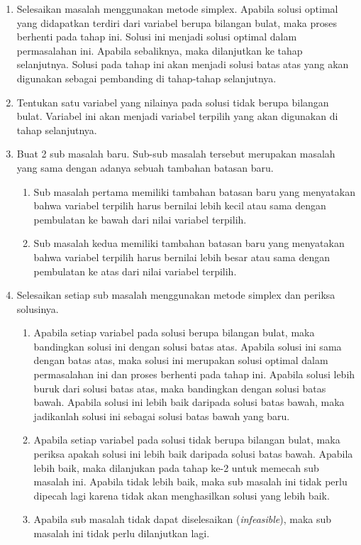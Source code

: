 \begin{enumerate}
	\item Selesaikan masalah menggunakan metode simplex. Apabila solusi optimal yang didapatkan terdiri dari variabel berupa bilangan bulat, maka proses berhenti pada tahap ini. Solusi ini menjadi solusi optimal dalam permasalahan ini. Apabila sebaliknya, maka dilanjutkan ke tahap selanjutnya. Solusi pada tahap ini akan menjadi solusi batas atas yang akan digunakan sebagai pembanding di tahap-tahap selanjutnya.

	\item Tentukan satu variabel yang nilainya pada solusi tidak berupa bilangan bulat. Variabel ini akan menjadi variabel terpilih yang akan digunakan di tahap selanjutnya.

	\item Buat 2 sub masalah baru. Sub-sub masalah tersebut merupakan masalah yang sama dengan adanya sebuah tambahan batasan baru. 
	\begin{enumerate}
		\item Sub masalah pertama memiliki tambahan batasan baru yang menyatakan bahwa variabel terpilih harus bernilai lebih kecil atau sama dengan pembulatan ke bawah dari nilai variabel terpilih.
		
		\item Sub masalah kedua memiliki tambahan batasan baru yang menyatakan bahwa variabel terpilih harus bernilai lebih besar atau sama dengan pembulatan ke atas dari nilai variabel terpilih.
	\end{enumerate}
		
	\item Selesaikan setiap sub masalah menggunakan metode simplex dan periksa solusinya.
	\begin{enumerate}
		\item Apabila setiap variabel pada solusi berupa bilangan bulat, maka bandingkan solusi ini dengan solusi batas atas. Apabila solusi ini sama dengan batas atas, maka solusi ini merupakan solusi optimal dalam permasalahan ini dan proses berhenti pada tahap ini. Apabila solusi lebih buruk dari solusi batas atas, maka bandingkan dengan solusi batas bawah. Apabila solusi ini lebih baik daripada solusi batas bawah, maka jadikanlah solusi ini sebagai solusi batas bawah yang baru.
		
		\item Apabila setiap variabel pada solusi tidak berupa bilangan bulat, maka periksa apakah solusi ini lebih baik daripada solusi batas bawah. Apabila lebih baik, maka dilanjukan pada tahap ke-2 untuk memecah sub masalah ini. Apabila tidak lebih baik, maka sub masalah ini tidak perlu dipecah lagi karena tidak akan menghasilkan solusi yang lebih baik.
		
		\item Apabila sub masalah tidak dapat diselesaikan (\textit{infeasible}), maka sub masalah ini tidak perlu dilanjutkan lagi.		
	\end{enumerate}
\end{enumerate}

